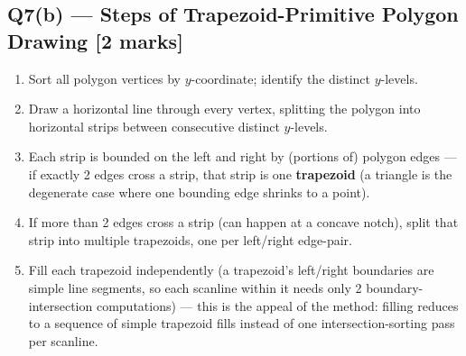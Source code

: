 \documentclass[12pt, a4paper]{article}
\newenvironment{answerbox}{\begin{mdframed}[style=answerframe]}{\end{mdframed}}
\begin{document}
\subsection*{Q7(b) --- Steps of Trapezoid-Primitive Polygon Drawing [2 marks]}
\begin{answerbox}
\begin{enumerate}[noitemsep]
  \item Sort all polygon vertices by $y$-coordinate; identify the distinct $y$-levels.
  \item Draw a horizontal line through every vertex, splitting the polygon into horizontal strips between consecutive distinct $y$-levels.
  \item Each strip is bounded on the left and right by (portions of) polygon edges --- if exactly 2 edges cross a strip, that strip is one \textbf{trapezoid} (a triangle is the degenerate case where one bounding edge shrinks to a point).
  \item If more than 2 edges cross a strip (can happen at a concave notch), split that strip into multiple trapezoids, one per left/right edge-pair.
  \item Fill each trapezoid independently (a trapezoid's left/right boundaries are simple line segments, so each scanline within it needs only 2 boundary-intersection computations) --- this is the appeal of the method: filling reduces to a sequence of simple trapezoid fills instead of one intersection-sorting pass per scanline.
\end{enumerate}
\end{answerbox}
\end{document}
